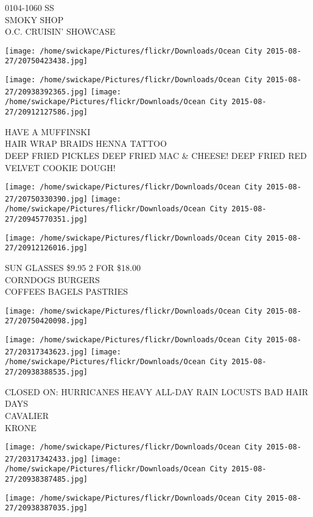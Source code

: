 \documentclass[10pt,letterpaper]{article}
\begin{document}
0104{-}1060 SS\\
SMOKY SHOP\\
O.C. CRUISIN' SHOWCASE
\pagebreak

\texttt{[image: /home/swickape/Pictures/flickr/Downloads/Ocean City 2015-08-27/20750423438.jpg]}

\vspace{0.25in}
\texttt{[image: /home/swickape/Pictures/flickr/Downloads/Ocean City 2015-08-27/20938392365.jpg]}
\texttt{[image: /home/swickape/Pictures/flickr/Downloads/Ocean City 2015-08-27/20912127586.jpg]}

HAVE A MUFFINSKI\\
HAIR WRAP BRAIDS HENNA TATTOO\\
DEEP FRIED PICKLES  DEEP FRIED MAC \& CHEESE!  DEEP FRIED RED VELVET COOKIE DOUGH!
\pagebreak

\texttt{[image: /home/swickape/Pictures/flickr/Downloads/Ocean City 2015-08-27/20750330390.jpg]}
\texttt{[image: /home/swickape/Pictures/flickr/Downloads/Ocean City 2015-08-27/20945770351.jpg]}

\texttt{[image: /home/swickape/Pictures/flickr/Downloads/Ocean City 2015-08-27/20912126016.jpg]}

SUN GLASSES \$9.95 2 FOR \$18.00\\
CORNDOGS BURGERS\\
COFFEES BAGELS PASTRIES
\pagebreak

\texttt{[image: /home/swickape/Pictures/flickr/Downloads/Ocean City 2015-08-27/20750420098.jpg]}

\vspace{0.25in}
\texttt{[image: /home/swickape/Pictures/flickr/Downloads/Ocean City 2015-08-27/20317343623.jpg]}
\texttt{[image: /home/swickape/Pictures/flickr/Downloads/Ocean City 2015-08-27/20938388535.jpg]}

CLOSED ON: HURRICANES HEAVY ALL{-}DAY RAIN LOCUSTS BAD HAIR DAYS\\
CAVALIER\\
KRONE
\pagebreak

\texttt{[image: /home/swickape/Pictures/flickr/Downloads/Ocean City 2015-08-27/20317342433.jpg]}
\texttt{[image: /home/swickape/Pictures/flickr/Downloads/Ocean City 2015-08-27/20938387485.jpg]}

\texttt{[image: /home/swickape/Pictures/flickr/Downloads/Ocean City 2015-08-27/20938387035.jpg]}
\end{document}
